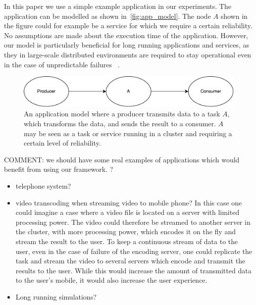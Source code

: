 \documentclass{cslthse-msc}
\begin{document}
In this paper we use a simple example application in our experiments. The application can be modelled as shown in~\autoref{fig:app_model}. The node $A$ shown in the figure could for example be a service for which we require a certain reliability. No assumptions are made about the execution time of the application. However, our model is particularly beneficial for long running applications and services, as they in large-scale distributed environments are required to stay operational even in the case of unpredictable failures ~\cite{imprRelAdaptRL}.

\begin{figure}[!hbt]
\centering
\includegraphics[scale=0.5]{images/app_model.pdf} 
\caption{An application model where a producer transmits data to a task $A$, which transforms the data, and sends the result to a consumer. $A$ may be seen as a task or service running in a cluster and requiring a certain level of reliability.}\label{fig:app_model}
\end{figure}

COMMENT: we should have some real examples of applications which would benefit from using our framework. ?
\begin{itemize}
\item telephone system?
\item video transcoding when streaming video to mobile phone? In this case one could imagine a case where a video file is located on a server with limited processing power. The video could therefore be streamed to another server in the cluster, with more processing power, which encodes it on the fly and stream the result to the user. To keep a continuous stream of data to the user, even in the case of failure of the encoding server, one could replicate the task and stream the video to several servers which encode and transmit the results to the user. While this would increase the amount of transmitted data to the user's mobile, it would also increase the user experience.
\item Long running simulations? \cite{relModelDistSimSystem}
\end{itemize}

\iffalse
\end{document}
